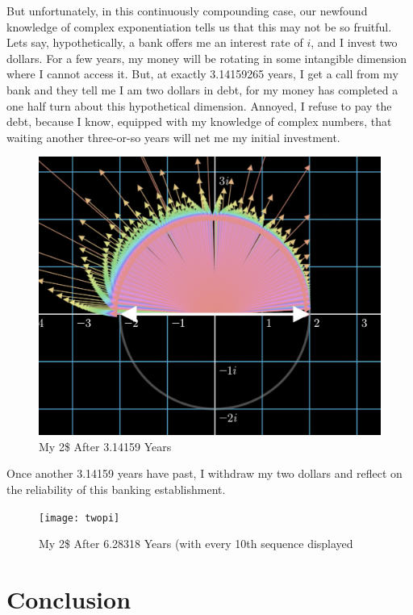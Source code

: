 \documentclass[11pt,a4paper]{article}
\begin{document}
But unfortunately, in this continuously compounding case, our newfound knowledge of complex exponentiation tells us that this may not be so fruitful.  Lets say, hypothetically, a bank offers me an interest rate of $i$, and I invest two dollars.  For a few years, my money will be rotating in some intangible dimension where I cannot access it. But, at exactly 3.14159265 years, I get a call from my bank and they tell me I am two dollars in debt, for my money has completed a one half turn about this hypothetical dimension. Annoyed, I refuse to pay the debt, because I know, equipped with my knowledge of complex numbers, that waiting another three-or-so years will net me my initial investment.
\begin{figure}[h]
\begin{center}
\includegraphics[scale=.3]{pi} 
\caption{My 2\$ After 3.14159 Years}
\end{center}
\end{figure}

Once another 3.14159 years have past, I withdraw my two dollars and reflect on the reliability of this banking establishment.

\begin{figure}[h]
\begin{center}
\texttt{[image: twopi]} 
\caption{My 2\$ After 6.28318 Years (with every 10th sequence displayed}
\end{center}
\end{figure}




\section{Conclusion}
\end{document}
